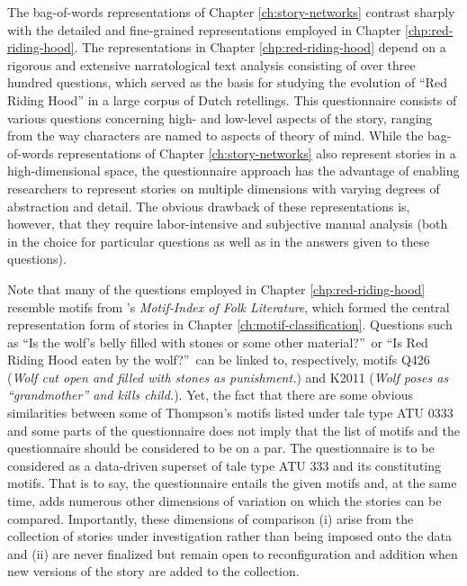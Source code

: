 The bag-of-words representations of Chapter \ref{ch:story-networks} contrast sharply with the detailed and fine-grained representations employed in Chapter \ref{chp:red-riding-hood}. The representations in Chapter \ref{chp:red-riding-hood} depend on a rigorous and extensive narratological text analysis consisting of over three hundred questions, which served as the basis for studying the evolution of ``Red Riding Hood'' in a large corpus of Dutch retellings. This questionnaire consists of various questions concerning high- and low-level aspects of the story, ranging from the way characters are named to aspects of theory of mind. While the bag-of-words representations of Chapter \ref{ch:story-networks} also represent stories in a high-dimensional space, the questionnaire approach has the advantage of enabling researchers to represent stories on multiple dimensions with varying degrees of abstraction and detail. The obvious drawback of these representations is, however, that they require labor-intensive and subjective manual analysis (both in the choice for particular questions as well as in the answers given to these questions).

Note that many of the questions employed in Chapter \ref{chp:red-riding-hood} resemble motifs from \citeauthor{thompson:1955}'s \emph{Motif-Index of Folk Literature}\autocite{thompson:1955}, which formed the central representation form of stories in Chapter \ref{ch:motif-classification}. Questions such as ``Is the wolf's belly filled with stones or some other material?''\ or ``Is Red Riding Hood eaten by the wolf?''\ can be linked to, respectively, motifs Q426 (\emph{Wolf cut open and filled with stones as punishment.}) and K2011 (\emph{Wolf poses as ``grandmother'' and kills child.}). Yet, the fact that there are some obvious similarities between some of Thompson's motifs listed under tale type ATU 0333 and some parts of the questionnaire does not imply that the list of motifs and the questionnaire should be considered to be on a par. The questionnaire is to be considered as a data-driven superset of tale type ATU 333 and its constituting motifs. That is to say, the questionnaire entails the given motifs and, at the same time, adds numerous other dimensions of variation on which the stories can be compared. Importantly, these dimensions of comparison (i) arise from the collection of stories under investigation rather than being imposed onto the data and (ii) are never finalized but remain open to reconfiguration and addition when new versions of the story are added to the collection.

